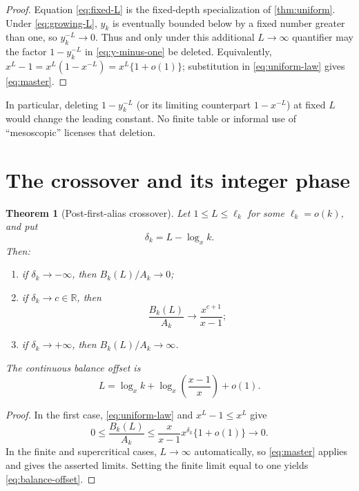 \documentclass[11pt]{article}
\newtheorem{theorem}{Theorem}[section]
\theoremstyle{remark}
\begin{document}
\begin{proof}
Equation \eqref{eq:fixed-L} is the fixed-depth specialization of
\cref{thm:uniform}.  Under \eqref{eq:growing-L},
$y_k$ is eventually bounded below by a fixed number greater than one, so
$y_k^{-L}\to0$.  Thus and only under this additional $L\to\infty$
quantifier may the factor $1-y_k^{-L}$ in \eqref{eq:y-minus-one} be
deleted.  Equivalently,
$x^L-1=x^L(1-x^{-L})=x^L\{1+o(1)\}$; substitution in
\eqref{eq:uniform-law} gives \eqref{eq:master}.
\end{proof}

In particular, deleting $1-y_k^{-L}$ (or its limiting counterpart
$1-x^{-L}$) at fixed $L$ would change the leading
constant.  No finite table or informal use of ``mesoscopic'' licenses that
deletion.

\section{The crossover and its integer phase}

\begin{theorem}[Post-first-alias crossover]\label{thm:crossover}
Let $1\le L\le\ell_k$ for some $\ell_k=o(k)$, and put
\begin{equation}\label{eq:delta}
 \delta_k=L-\log_xk.
\end{equation}
Then:
\begin{enumerate}
 \item if $\delta_k\to-\infty$, then $B_k(L)/A_k\to0$;
 \item if $\delta_k\to c\in\mathbb R$, then
 \begin{equation}\label{eq:finite-crossover}
  \frac{B_k(L)}{A_k}\longrightarrow
  \frac{x^{c+1}}{x-1};
 \end{equation}
 \item if $\delta_k\to+\infty$, then $B_k(L)/A_k\to\infty$.
\end{enumerate}
The continuous balance offset is
\begin{equation}\label{eq:balance-offset}
 L=\log_xk+\log_x\left(\frac{x-1}{x}\right)+o(1).
\end{equation}
\end{theorem}

\begin{proof}
In the first case, \eqref{eq:uniform-law} and $x^L-1\le x^L$ give
\[
 0\le\frac{B_k(L)}{A_k}
 \le\frac{x}{x-1}x^{\delta_k}\{1+o(1)\}\longrightarrow0.
\]
In the finite and supercritical cases, $L\to\infty$ automatically, so
\eqref{eq:master} applies and gives the asserted limits.  Setting the finite
limit equal to one yields \eqref{eq:balance-offset}.
\end{proof}
\end{document}
